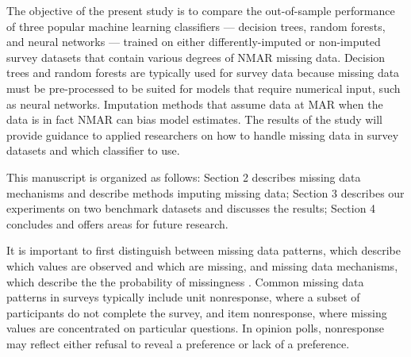 \documentclass[10pt]{book}
\theoremstyle{definition}
\begin{document}
The objective of the present study is to compare the out-of-sample performance of three popular machine learning classifiers --- decision trees, random forests, and neural networks --- trained on either differently-imputed or non-imputed survey datasets that contain various degrees of NMAR missing data. Decision trees and random forests are typically used for survey data because missing data must be pre-processed to be suited for models that require numerical input, such as neural networks. Imputation methods that assume data at MAR when the data is in fact NMAR can bias model estimates. The results of the study will provide guidance to applied researchers on how to handle missing data in survey datasets and which classifier to use. 

This manuscript is organized as follows: Section 2 describes missing data mechanisms and describe methods imputing missing data; Section 3 describes our experiments on two benchmark datasets and discusses the results; Section 4 concludes and offers areas for future research. 

\par

\lhead[\footnotesize\thepage\fancyplain{}\leftmark]{}\rhead[]{\fancyplain{}\rightmark\footnotesize\thepage}%

\setcounter{chapter}{2}
\setcounter{equation}{0} %



It is important to first distinguish between missing data patterns, which describe which values are observed and which are missing, and missing data mechanisms, which describe the the probability of missingness  \citep{little2014}. Common missing data patterns in surveys typically include unit nonresponse, where a subset of participants do not complete the survey, and item nonresponse, where missing values are concentrated on particular questions. In opinion polls, nonresponse may reflect either refusal to reveal a preference or lack of a preference. 
\end{document}
